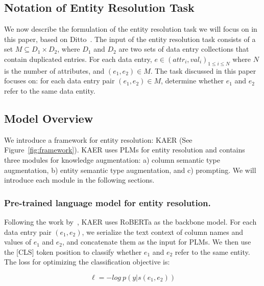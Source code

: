 


\subsection{Notation of Entity Resolution Task}
We now describe the formulation of the entity resolution task we will focus on in this paper, based on Ditto~\cite{li_deep_2020}. The input of the entity resolution task consists of a set $M \subseteq D_1 \times D_2$, where $D_1$ and $D_2$ are two sets of data entry collections that contain duplicated entries.  
For each data entry, $e \in {(attr_i, val_i)}_{1 \leq i \leq N}$ where $N$ is the number of attributes, and $(e_1, e_2) \in M$. The task discussed in this paper focuses on: for each data entry pair $(e_1, e_2) \in M$, determine whether $e_1$ and $e_2$ refer to the same data entity.

\subsection{Model Overview}
We introduce a framework for entity resolution: KAER (See Figure~\ref{fig:framework}). 
KAER uses PLMs for entity resolution and contains three modules for knowledge augmentation: a) column semantic type augmentation, b) entity semantic type augmentation, and c) prompting. We will introduce each module in the following sections.


\subsubsection{Pre-trained language model for entity resolution.}
Following the work by~\citet{li_deep_2020}, KAER uses RoBERTa as the backbone model. For each data entry pair $(e_1, e_2)$, we serialize the text context of column names and values of $e_1$ and $e_2$, and concatenate them as the input for PLMs. We then use the [CLS] token position to classify whether $e_1$ and $e_2$ refer to the same entity. 
The loss for optimizing the classification objective is:

\begin{equation}
    \ell = - log\ p(y | s(e_1, e_2))
\end{equation}

